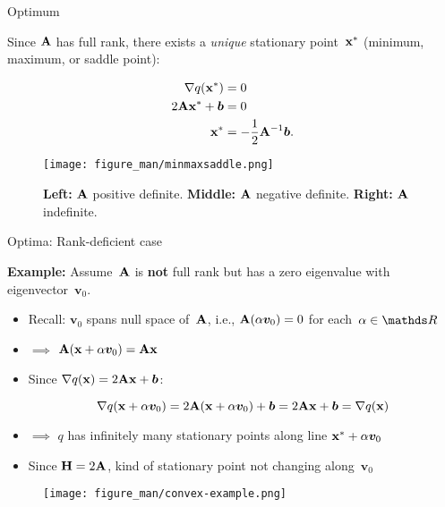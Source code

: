 \documentclass[11pt,compress,t,notes=noshow, xcolor=table]{beamer}
\begin{document}
\begin{vbframe}{Optimum}

Since $\mathbf{A}$ has full rank, there exists a \textit{unique} stationary point~$\mathbf{x}^\ast$ (minimum, maximum, or saddle point):

\vspace{-\baselineskip}

\begin{align*}
    \nabla q(\mathbf{x}^\ast) &= 0 \\
    2 \mathbf{A} \mathbf{x}^\ast + \bm{b} &= 0 \\
    \mathbf{x}^\ast &= -\frac{1}{2} \mathbf{A}^{-1} \bm{b}.
\end{align*}  

\vspace{-0.5\baselineskip}

\begin{figure}
    \centering
    \texttt{[image: figure\_man/minmaxsaddle.png]}
    \caption*{
        \footnotesize
        \textbf{Left:} $\mathbf{A}$ positive definite.
        \textbf{Middle:} $\mathbf{A}$ negative definite.
        \textbf{Right:} $\mathbf{A}$ indefinite.}
\end{figure}

\end{vbframe}

\begin{vbframe}{Optima: Rank-deficient case}

\footnotesize

\textbf{Example:} Assume~$\mathbf{A}$ is \textbf{not} full rank but has a zero eigenvalue with eigenvector~$\bm{v}_0$.

\begin{itemize}
    \item Recall: $\bm{v}_0$ spans null space of~$\mathbf{A}$, i.e., $\mathbf{A}(\alpha\bm{v}_0) = 0$ for each~$\alpha\in\R$
    \item $\implies$ $\mathbf{A}(\mathbf{x} + \alpha\bm{v}_0) = \mathbf{A}\mathbf{x}$
    \item Since $\nabla q(\mathbf{x}) = 2\mathbf{A}\mathbf{x} + \bm{b}$:
        
        \vspace{-0.5\baselineskip}
        
        \begin{equation*}
            \nabla q(\mathbf{x}+\alpha\bm{v}_0) = 2\mathbf{A}(\mathbf{x}+\alpha\bm{v}_0)+\bm{b} = 2\mathbf{A}\mathbf{x}+\bm{b} = \nabla q(\mathbf{x})
        \end{equation*}
    \item $\implies$ $q$ has infinitely many stationary points along line $\mathbf{x}^\ast+\alpha\bm{v}_0$
    \item Since $\mathbf{H} = 2\mathbf{A}$, kind of stationary point not changing along~$\bm{v}_0$
\end{itemize}

\begin{figure}
    \centering
    \texttt{[image: figure\_man/convex-example.png]}
\end{figure}

\end{vbframe}

\endlecture
\end{document}
